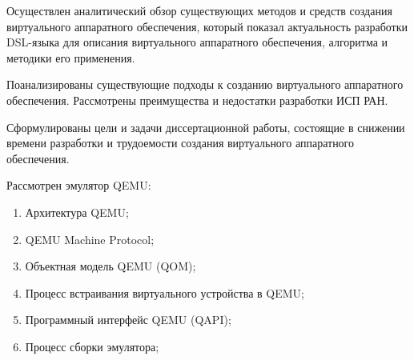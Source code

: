 Осуществлен аналитический обзор существующих методов и средств
создания виртуального аппаратного обеспечения, который показал
актуальность разработки DSL-языка для описания виртуального аппаратного
обеспечения, алгоритма и методики его применения.

Поанализированы существующие подходы к созданию виртуального
аппаратного обеспечения. Рассмотрены преимущества и недостатки
разработки ИСП РАН.

Сформулированы цели и задачи диссертационной работы, состоящие в
снижении времени разработки и трудоемости создания виртуального
аппаратного обеспечения.

Рассмотрен эмулятор QEMU:
\begin{enumerate}[label={\arabic*)}]
    \item Архитектура QEMU;
    \item QEMU Machine Protocol;
    \item Объектная модель QEMU (QOM);
    \item Процесс встраивания виртуального устройства в QEMU;
    \item Программный интерфейс QEMU (QAPI);
    \item Процесс сборки эмулятора;
\end{enumerate}
